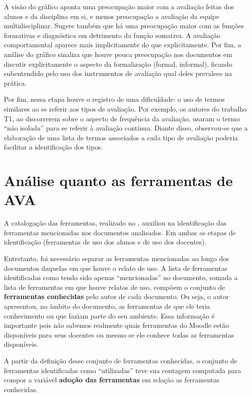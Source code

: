 A visão do gráfico aponta uma preocupação maior com a avaliação feitas dos alunos e da disciplina em si, e menos preocupação a avaliação da equipe multidisciplinar. Sugere também que há uma preocupação maior com as funções formativas e diagnóstica em detrimento da função somativa. A avaliação comportamental aparece mais implicitamente do que explicitamente. Por fim, a análise do gráfico sinaliza que houve pouca preocupação nos documentos em discutir explicitamente o aspecto da formalização (formal, informal), ficando subentendido pelo uso dos instrumentos de avaliação qual deles prevalece na prática.

Por fim, nessa etapa houve o registro de uma dificuldade: o uso de termos similares ao se referir aos tipos de avaliação. Por exemplo, os autores do trabalho T1, ao discorrerem sobre o aspecto de frequência da avaliação, usaram o termo ``não isolada'' para se referir à avaliação contínua. Diante disso, observou-se que a elaboração de uma lista de termos associados a cada tipo de avaliação poderia facilitar a identificação dos tipos.

\section{Análise quanto as ferramentas de AVA}%
A catalogação das ferramentas, realizado no , auxiliou na identificação das ferramentas mencionadas nos documentos analisados. Em ambas as etapas de identificação (ferramentas de uso dos alunos e de uso dos docentes).

Entretanto, foi necessário separar as ferramentas mencionadas ao longo dos documentos daquelas em que houve o relato de uso. A lista de ferramentas identificadas como tendo sido apenas ``mencionadas'' no documento, somada a lista de ferramentas em que houve relatos de uso, compõem o conjunto de \textbf{ferramentas conhecidas} pelo autor de cada documento. Ou seja, o autor apresentou, no âmbito do documento, as ferramentas de que ele teria conhecimento ou que faziam parte do seu ambiente. Essa informação é importante pois não sabemos realmente quais ferramentas do Moodle estão disponíveis para seus docentes ou mesmo se ele conhece todas as ferramentas disponíveis.

A partir da definição desse conjunto de ferramentas conhecidas, o conjunto de ferramentas identificadas como ``utilizadas'' teve sua contagem computada para compor a variável \textbf{adoção das ferramentas} em relação as ferramentas conhecidas. 

